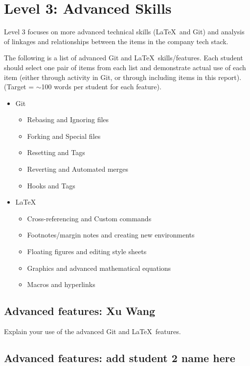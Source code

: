\documentclass[a4paper, 11pt]{report}
\begin{document}
\newpage
\section{Level 3: Advanced Skills}

Level 3 focuses on more advanced technical skills (\LaTeX\ and Git) and analysis of linkages and relationships between the items in the company tech stack.

The following is a list of advanced Git and \LaTeX\ skills/features. Each student should select one pair of items from each list and demonstrate actual use of each item (either through activity in Git, or through including items in this report). (Target = $\sim$100 words per student for each feature).
\begin{itemize}
    \item Git
    \begin{itemize}
        \item Rebasing and Ignoring files
        \item Forking and Special files
        \item Resetting and Tags
        \item Reverting and Automated merges
        \item Hooks and Tags
    \end{itemize}
    \item \LaTeX\ 
    \begin{itemize}
        \item Cross-referencing and Custom commands
        \item Footnotes/margin notes and creating new environments
        \item Floating figures and editing style sheets
        \item Graphics and advanced mathematical equations
        \item Macros and hyperlinks
    \end{itemize}
\end{itemize}

\subsection{Advanced features: Xu Wang}

Explain your use of the advanced Git and \LaTeX\ features. 

\subsection{Advanced features: add student 2 name here}
\end{document}
